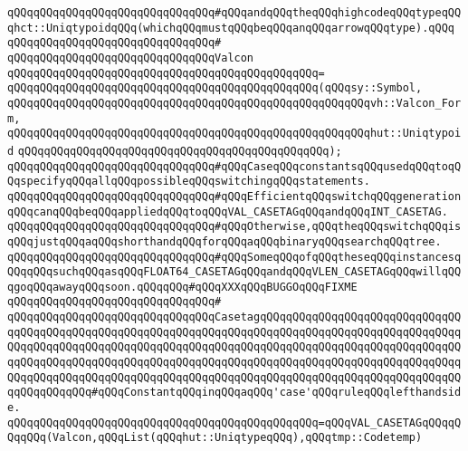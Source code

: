 \verb|qQQqqQQqqQQqqQQqqQQqqQQqqQQqqQQq#qQQqandqQQqtheqQQqhighcodeqQQqtypeqQQqhct::UniqtypoidqQQq(whichqQQqmustqQQqbeqQQqanqQQqarrowqQQqtype).qQQq|\newline
\verb|qQQqqQQqqQQqqQQqqQQqqQQqqQQqqQQq#|\newline
\verb|qQQqqQQqqQQqqQQqqQQqqQQqqQQqqQQqValcon|\newline
\verb|qQQqqQQqqQQqqQQqqQQqqQQqqQQqqQQqqQQqqQQqqQQqqQQq=|\newline
\verb|qQQqqQQqqQQqqQQqqQQqqQQqqQQqqQQqqQQqqQQqqQQqqQQq(qQQqsy::Symbol,|\newline
\verb|qQQqqQQqqQQqqQQqqQQqqQQqqQQqqQQqqQQqqQQqqQQqqQQqqQQqqQQqvh::Valcon_Form,|\newline
\verb|qQQqqQQqqQQqqQQqqQQqqQQqqQQqqQQqqQQqqQQqqQQqqQQqqQQqqQQqhut::Uniqtypoid|\newline
\verb|qQQqqQQqqQQqqQQqqQQqqQQqqQQqqQQqqQQqqQQqqQQqqQQq);|\newline
\newline
\newline
\newline
\verb|qQQqqQQqqQQqqQQqqQQqqQQqqQQqqQQq#qQQqCaseqQQqconstantsqQQqusedqQQqtoqQQqspecifyqQQqallqQQqpossibleqQQqswitchingqQQqstatements.|\newline
\verb|qQQqqQQqqQQqqQQqqQQqqQQqqQQqqQQq#qQQqEfficientqQQqswitchqQQqgenerationqQQqcanqQQqbeqQQqappliedqQQqtoqQQqVAL_CASETAGqQQqandqQQqINT_CASETAG.|\newline
\verb|qQQqqQQqqQQqqQQqqQQqqQQqqQQqqQQq#qQQqOtherwise,qQQqtheqQQqswitchqQQqisqQQqjustqQQqaqQQqshorthandqQQqforqQQqaqQQqbinaryqQQqsearchqQQqtree.|\newline
\verb|qQQqqQQqqQQqqQQqqQQqqQQqqQQqqQQq#qQQqSomeqQQqofqQQqtheseqQQqinstancesqQQqqQQqsuchqQQqasqQQqFLOAT64_CASETAGqQQqandqQQqVLEN_CASETAGqQQqwillqQQqgoqQQqawayqQQqsoon.qQQqqQQq#qQQqXXXqQQqBUGGOqQQqFIXME|\newline
\verb|qQQqqQQqqQQqqQQqqQQqqQQqqQQqqQQq#|\newline
\verb|qQQqqQQqqQQqqQQqqQQqqQQqqQQqqQQqCasetagqQQqqQQqqQQqqQQqqQQqqQQqqQQqqQQqqQQqqQQqqQQqqQQqqQQqqQQqqQQqqQQqqQQqqQQqqQQqqQQqqQQqqQQqqQQqqQQqqQQqqQQqqQQqqQQqqQQqqQQqqQQqqQQqqQQqqQQqqQQqqQQqqQQqqQQqqQQqqQQqqQQqqQQqqQQqqQQqqQQqqQQqqQQqqQQqqQQqqQQqqQQqqQQqqQQqqQQqqQQqqQQqqQQqqQQqqQQqqQQqqQQqqQQqqQQqqQQqqQQqqQQqqQQqqQQqqQQqqQQqqQQqqQQqqQQqqQQqqQQqqQQqqQQqqQQqqQQqqQQqqQQq#qQQqConstantqQQqinqQQqaqQQq'case'qQQqruleqQQqlefthandside.|\newline
\verb|qQQqqQQqqQQqqQQqqQQqqQQqqQQqqQQqqQQqqQQqqQQqqQQq=qQQqVAL_CASETAGqQQqqQQqqQQq(Valcon,qQQqList(qQQqhut::UniqtypeqQQq),qQQqtmp::Codetemp)|\newline
